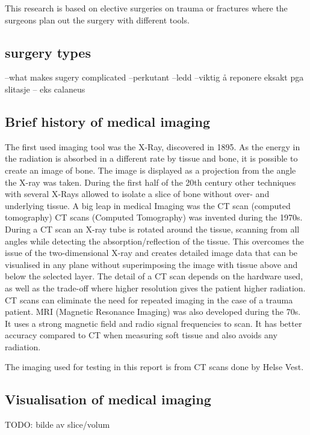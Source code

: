 \documentclass[a4paper]{report}
\begin{document}
This research is based on elective surgeries on trauma or fractures where the surgeons plan out the surgery with different tools.

\subsection{surgery types}
--what makes sugery complicated
--perkutant
--ledd
--viktig å reponere eksakt pga slitasje
-- eks calaneus

\subsection{Brief history of medical imaging}
The first used imaging tool was the X-Ray, discovered in 1895\cite{hamblen_outline_2010}\cite{suetens_fundamentals_2017}. As the energy in the radiation is absorbed in a different rate by tissue and bone, it is possible to create an image of bone. The image is displayed as a projection from the angle the X-ray was taken. During the first half of the 20th century other techniques with several X-Rays allowed to isolate a slice of bone without over- and underlying tissue. A big leap in medical Imaging was the CT scan (computed tomography)\cite{bradley_history_2008}
CT scans (Computed Tomography) was invented during the 1970s. During a CT scan an X-ray tube is rotated around the tissue, scanning from all angles while detecting the absorption/reflection of the tissue. This overcomes the issue of the two-dimensional X-ray and creates detailed image data that can be visualised in any plane without superimposing the image with tissue above and below the selected layer\cite{hamblen_outline_2010}. The detail of a CT scan depends on the hardware used, as well as the trade-off where higher resolution gives the patient higher radiation\cite{bradley_history_2008}. CT scans can eliminate the need for repeated imaging in the case of a trauma patient\cite{swiontkowski_manual_2013}.
MRI (Magnetic Resonance Imaging) was also developed during the 70s. It uses a strong magnetic field and radio signal frequencies to scan. It has better accuracy compared to CT when measuring soft tissue and also avoids any radiation.


The imaging used for testing in this report is from CT scans done by Helse Vest.
\subsection{Visualisation of medical imaging}
TODO: bilde av slice/volum
\end{document}
